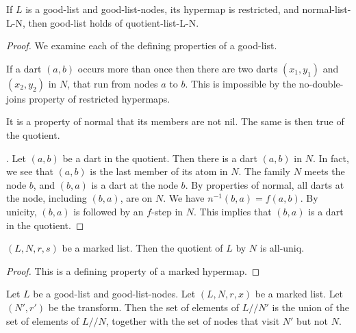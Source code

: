 \begin{lemma}
If $L$ is a good-list and good-list-nodes, its hypermap is restricted,
and normal-list-L-N, then good-list holds of quotient-list-L-N.
\end{lemma}

\begin{proof} We examine each of the defining properties of a good-list.  

If a dart $(a,b)$ occurs more than once  then there are two darts $(x_1,y_1)$ and $(x_2,y_2)$ in $N$, that run from
nodes $a$ to $b$.  This is impossible by the no-double-joins property of restricted hypermaps.

  It is a property of normal that its members are not nil.  The same is then true of the quotient.

.  Let $(a,b)$ be a dart in the quotient.  Then there is a dart $(a,b)$ in $N$.  In fact, we see that $(a,b)$ is the last member of
its atom in $N$.  The family $N$ meets the node $b$,
and $(b,a)$ is a dart at the node $b$.  By properties of normal, all darts at the node, including $(b,a)$, are on $N$.
We have $n^{-1}(b,a) = f (a,b)$.  By unicity, $(b,a)$ is followed by an $f$-step in $N$.  This implies that $(b,a)$ is a dart in the
quotient. 
\end{proof}

\begin{lemma}
$(L,N,r,s)$ be a marked list.  Then the quotient of $L$ by $N$ is all-uniq.
\end{lemma}

\begin{proof}  This is a defining property of a marked hypermap.
\end{proof}

\begin{lemma}\guid{}
Let $L$ be a good-list and good-list-nodes.
Let $(L,N,r,x)$ be a marked list.  Let $(N',r')$ be the transform.  Then the set of elements of $L//N'$
is the union of the set of elements of $L//N$, together with the set of nodes that visit $N'$ but not $N$.
\end{lemma}

